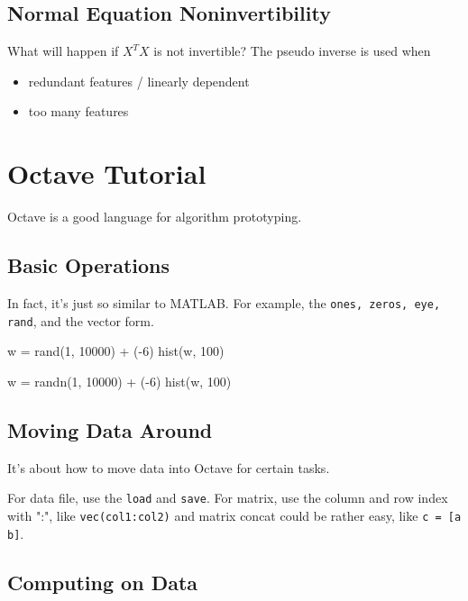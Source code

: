 \documentclass[en,11pt,english,black,simple]{../elegantbook}
\begin{document}
\subsection{Normal Equation Noninvertibility}

What will happen if \(X^T X\) is not invertible? The pseudo inverse is used when \begin{itemize}
    \item redundant features / linearly dependent 
    \item too many features 
\end{itemize}

\section{Octave Tutorial}

Octave is a good language for algorithm prototyping. 

\subsection{Basic Operations}

In fact, it's just so similar to MATLAB. For example, the \lstinline{ones, zeros, eye, rand}, and the vector form.

\begin{ocode}
    w = rand(1, 10000) + (-6) %
    hist(w, 100)
\end{ocode} 


\begin{ocode}
    w = randn(1, 10000) + (-6) %
    hist(w, 100)
\end{ocode} 

\subsection{Moving Data Around}

It's about how to move data into Octave for certain tasks. 

For data file, use the \lstinline{load} and \lstinline{save}. For matrix, use the column and row index with ":", like \lstinline{vec(col1:col2)} and matrix concat could be rather easy, like \lstinline{c = [a b]}.

\subsection{Computing on Data}
\end{document}
